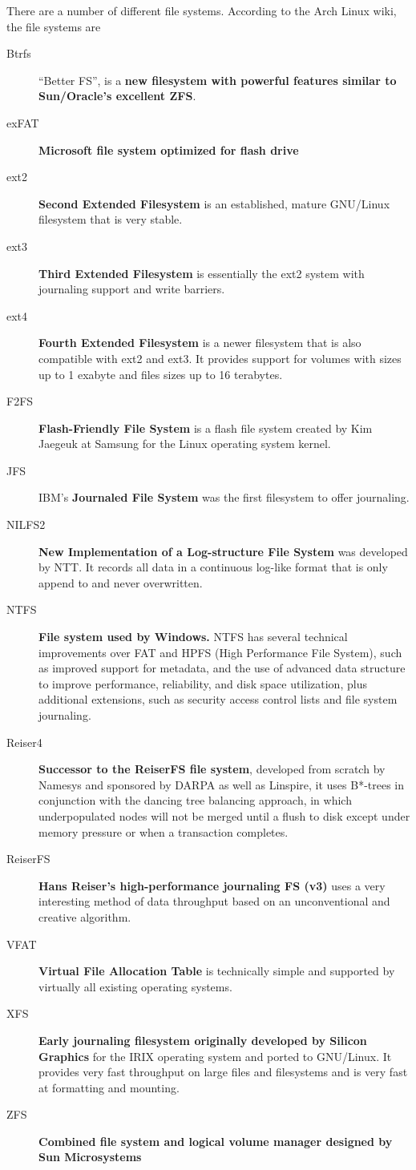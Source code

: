 \documentclass[]{article}
\begin{document}
\begin{enumerate}
There are a number of different file systems. According to the Arch Linux wiki,
the file systems are
\begin{description}
\item[Btrfs] ``Better FS'', is a \textbf{new filesystem with powerful features
similar to Sun/Oracle's excellent ZFS}.
\item[exFAT] \textbf{Microsoft file system optimized for flash drive}
\item[ext2] \textbf{Second Extended Filesystem} is an established, mature
GNU/Linux filesystem that is very stable.
\item[ext3] \textbf{Third Extended Filesystem} is essentially the ext2 system
with journaling support and write barriers.
\item[ext4] \textbf{Fourth Extended Filesystem} is a newer filesystem that is
also compatible with ext2 and ext3. It provides support for volumes with sizes
up to 1 exabyte and files sizes up to 16 terabytes.
\item[F2FS] \textbf{Flash-Friendly File System} is a flash file system created
by Kim Jaegeuk at Samsung for the Linux operating system kernel.
\item[JFS] IBM's \textbf{Journaled File System} was the first filesystem to
offer journaling.
\item[NILFS2] \textbf{New Implementation of a Log-structure File System} was
developed by NTT. It records all data in a continuous log-like format that is
only append to and never overwritten.
\item[NTFS] \textbf{File system used by Windows.} NTFS has several technical
improvements over FAT and HPFS (High Performance File System), such as improved
support for metadata, and the use of advanced data structure to improve
performance, reliability, and disk space utilization, plus additional
extensions, such as security access control lists and file system journaling.
\item[Reiser4] \textbf{Successor to the ReiserFS file system}, developed from
scratch by Namesys and sponsored by DARPA as well as Linspire, it uses B*-trees
in conjunction with the dancing tree balancing approach, in which underpopulated
nodes will not be merged until a flush to disk except under memory pressure or
when a transaction completes.
\item[ReiserFS] \textbf{Hans Reiser's high-performance journaling FS (v3)} uses
a very interesting method of data throughput based on an unconventional and
creative algorithm.
\item[VFAT] \textbf{Virtual File Allocation Table} is technically simple and
supported by virtually all existing operating systems.
\item[XFS] \textbf{Early journaling filesystem originally developed by Silicon
Graphics} for the IRIX operating system and ported to GNU/Linux. It provides
very fast throughput on large files and filesystems and is very fast at
formatting and mounting.
\item[ZFS] \textbf{Combined file system and logical volume manager designed by
Sun Microsystems}
\end{description}


\end{enumerate}
\end{document}
